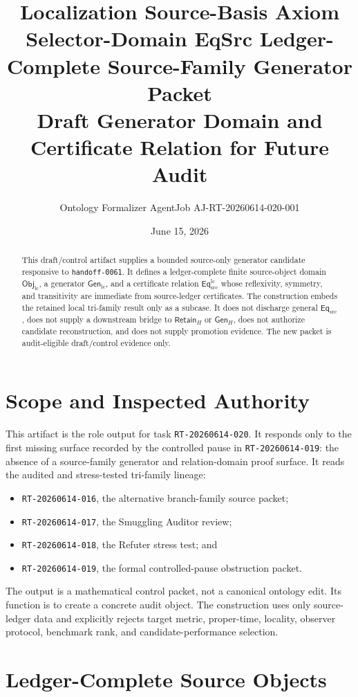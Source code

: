 \documentclass[11pt]{article}
\title{\textbf{Localization Source-Basis Axiom Selector-Domain EqSrc Ledger-Complete Source-Family Generator Packet}\\[0.35em]
\large Draft Generator Domain and Certificate Relation for Future Audit}
\author{Ontology Formalizer AgentJob AJ-RT-20260614-020-001}
\date{June 15, 2026}
\newcommand{\EqSrc}{\mathsf{Eq}_{\mathrm{src}}}
\newcommand{\EqLC}{\mathsf{Eq}_{\mathrm{src}}^{\mathrm{lc}}}
\newcommand{\ObjLC}{\mathsf{Obj}_{\mathrm{lc}}}
\newcommand{\GenLC}{\mathsf{Gen}_{\mathrm{lc}}}
\newcommand{\RetainH}{\mathsf{Retain}_{H}}
\newcommand{\GenH}{\mathsf{Gen}_{H}}
\begin{document}
\maketitle

\begin{abstract}
This draft/control artifact supplies a bounded source-only generator
candidate responsive to \texttt{handoff-0061}. It defines a
ledger-complete finite source-object domain \(\ObjLC\), a generator
\(\GenLC\), and a certificate relation \(\EqLC\) whose reflexivity,
symmetry, and transitivity are immediate from source-ledger certificates.
The construction embeds the retained local tri-family result only as a
subcase. It does not discharge general \(\EqSrc\), does not supply a
downstream bridge to \(\RetainH\) or \(\GenH\), does not authorize
candidate reconstruction, and does not supply promotion evidence. The
new packet is audit-eligible draft/control evidence only.
\end{abstract}

\section{Scope and Inspected Authority}

This artifact is the role output for task \texttt{RT-20260614-020}. It
responds only to the first missing surface recorded by the controlled
pause in \texttt{RT-20260614-019}: the absence of a source-family
generator and relation-domain proof surface. It reads the audited and
stress-tested tri-family lineage:
\begin{itemize}
    \item \texttt{RT-20260614-016}, the alternative branch-family source
    packet;
    \item \texttt{RT-20260614-017}, the Smuggling Auditor review;
    \item \texttt{RT-20260614-018}, the Refuter stress test; and
    \item \texttt{RT-20260614-019}, the formal controlled-pause
    obstruction packet.
\end{itemize}

The output is a mathematical control packet, not a canonical ontology
edit. Its function is to create a concrete audit object. The construction
uses only source-ledger data and explicitly rejects target metric,
proper-time, locality, observer protocol, benchmark rank, and
candidate-performance selection.

\section{Ledger-Complete Source Objects}
\end{document}
